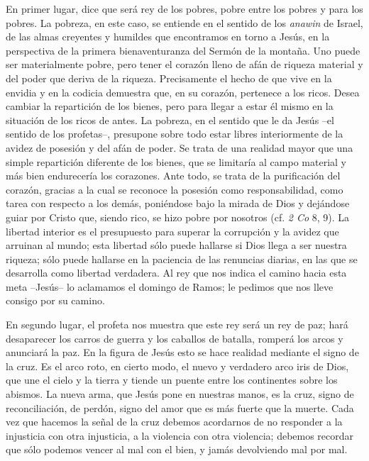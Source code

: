 \begin{body}
En primer lugar, dice que será rey de los pobres, pobre entre los pobres y para los pobres. La pobreza, en este caso, se entiende en el sentido de los \textit{anawin} de Israel, de las almas creyentes y humildes que encontramos en torno a Jesús, en la perspectiva de la primera bienaventuranza del Sermón de la montaña. Uno puede ser materialmente pobre, pero tener el corazón lleno de afán de riqueza material y del poder que deriva de la riqueza. Precisamente el hecho de que vive en la envidia y en la codicia demuestra que, en su corazón, pertenece a los ricos. Desea cambiar la repartición de los bienes, pero para llegar a estar él mismo en la situación de los ricos de antes. La pobreza, en el sentido que le da Jesús –el sentido de los profetas–, presupone sobre todo estar libres interiormente de la avidez de posesión y del afán de poder. Se trata de una realidad mayor que una simple repartición diferente de los bienes, que se limitaría al campo material y más bien endurecería los corazones. Ante todo, se trata de la purificación del corazón, gracias a la cual se reconoce la posesión como responsabilidad, como tarea con respecto a los demás, poniéndose bajo la mirada de Dios y dejándose guiar por Cristo que, siendo rico, se hizo pobre por nosotros (cf. \textit{2 Co} 8, 9). La libertad interior es el presupuesto para superar la corrupción y la avidez que arruinan al mundo; esta libertad sólo puede hallarse si Dios llega a ser nuestra riqueza; sólo puede hallarse en la paciencia de las renuncias diarias, en las que se desarrolla como libertad verdadera. Al rey que nos indica el camino hacia esta meta –Jesús– lo aclamamos el domingo de Ramos; le pedimos que nos lleve consigo por su camino.

En segundo lugar, el profeta nos muestra que este rey será un rey de paz; hará desaparecer los carros de guerra y los caballos de batalla, romperá los arcos y anunciará la paz. En la figura de Jesús esto se hace realidad mediante el signo de la cruz. Es el arco roto, en cierto modo, el nuevo y verdadero arco iris de Dios, que une el cielo y la tierra y tiende un puente entre los continentes sobre los abismos. La nueva arma, que Jesús pone en nuestras manos, es la cruz, signo de reconciliación, de perdón, signo del amor que es más fuerte que la muerte. Cada vez que hacemos la señal de la cruz debemos acordarnos de no responder a la injusticia con otra injusticia, a la violencia con otra violencia; debemos recordar que sólo podemos vencer al mal con el bien, y jamás devolviendo mal por mal.


\end{body}
